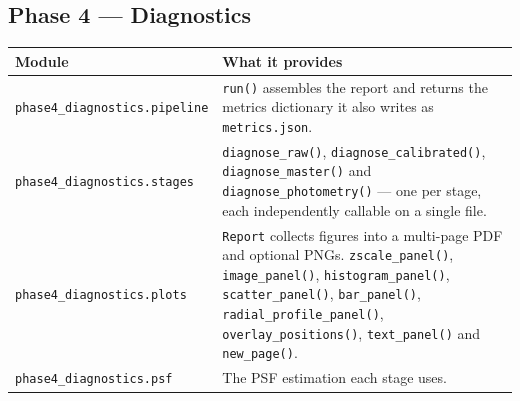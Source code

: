 \documentclass[11pt,a4paper]{article}
\begin{document}
\subsection{Phase 4 --- Diagnostics}
\begin{center}
\begin{longtable}{|p{3.6cm}|p{10.9cm}|}
\hline
\textbf{Module} & \textbf{What it provides} \\
\hline
\endhead
\texttt{phase4\_diagnostics.\allowbreak pipeline} & \texttt{run()} assembles the report and returns the metrics dictionary it also writes as \texttt{metrics.json}. \\
\hline
\texttt{phase4\_diagnostics.\allowbreak stages} & \texttt{diagnose\_raw()}, \texttt{diagnose\_calibrated()}, \texttt{diagnose\_master()} and \texttt{diagnose\_photometry()} --- one per stage, each independently callable on a single file. \\
\hline
\texttt{phase4\_diagnostics.\allowbreak plots} & \texttt{Report} collects figures into a multi-page PDF and optional PNGs. \texttt{zscale\_panel()}, \texttt{image\_panel()}, \texttt{histogram\_panel()}, \texttt{scatter\_panel()}, \texttt{bar\_panel()}, \texttt{radial\_profile\_panel()}, \texttt{overlay\_positions()}, \texttt{text\_panel()} and \texttt{new\_page()}. \\
\hline
\texttt{phase4\_diagnostics.psf} & The PSF estimation each stage uses. \\
\hline
\end{longtable}
\end{center}
\end{document}
